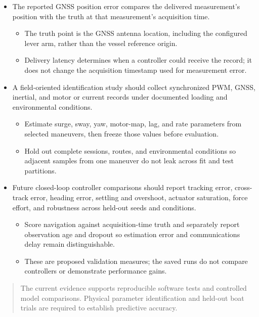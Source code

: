 \documentclass[10pt,letterpaper]{article}
\newenvironment{reportnote}{\begin{quote}\small\color{navy}}{\end{quote}}
\begin{document}
\begin{itemize}
\item
  The reported GNSS position error compares the delivered measurement's position with the truth at that measurement's acquisition time.

  \begin{itemize}
  \item
    The truth point is the GNSS antenna location, including the configured lever arm, rather than the vessel reference origin.
  \item
    Delivery latency determines when a controller could receive the record; it does not change the acquisition timestamp used for measurement error.
  \end{itemize}
\item
  A field-oriented identification study should collect synchronized PWM, GNSS, inertial, and motor or current records under documented loading and environmental conditions.

  \begin{itemize}
  \item
    Estimate surge, sway, yaw, motor-map, lag, and rate parameters from selected maneuvers, then freeze those values before evaluation.
  \item
    Hold out complete sessions, routes, and environmental conditions so adjacent samples from one maneuver do not leak across fit and test partitions.
  \end{itemize}
\item
  Future closed-loop controller comparisons should report tracking error, cross-track error, heading error, settling and overshoot, actuator saturation, force effort, and robustness across held-out seeds and conditions.

  \begin{itemize}
  \item
    Score navigation against acquisition-time truth and separately report observation age and dropout so estimation error and communications delay remain distinguishable.
  \item
    These are proposed validation measures; the saved runs do not compare controllers or demonstrate performance gains.
  \end{itemize}
\end{itemize}

\begin{reportnote}

The current evidence supports reproducible software tests and controlled model comparisons. Physical parameter identification and held-out boat trials are required to establish predictive accuracy.

\end{reportnote}
\end{document}
